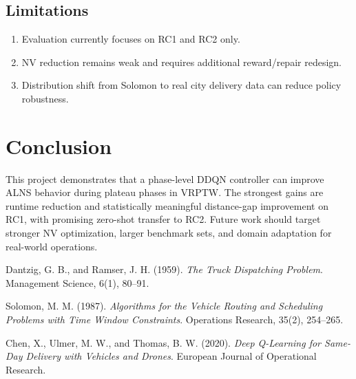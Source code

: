 \documentclass[13pt, a4paper]{extarticle}
\begin{document}
\subsection{Limitations}
\begin{enumerate}
    \item Evaluation currently focuses on RC1 and RC2 only.
    \item NV reduction remains weak and requires additional reward/repair redesign.
    \item Distribution shift from Solomon to real city delivery data can reduce policy robustness.
\end{enumerate}

\section{Conclusion}
This project demonstrates that a phase-level DDQN controller can improve ALNS behavior during plateau phases in VRPTW. The strongest gains are runtime reduction and statistically meaningful distance-gap improvement on RC1, with promising zero-shot transfer to RC2. Future work should target stronger NV optimization, larger benchmark sets, and domain adaptation for real-world operations.

\newpage
\begin{thebibliography}{}

Dantzig, G. B., and Ramser, J. H. (1959).
\textit{The Truck Dispatching Problem}.
Management Science, 6(1), 80--91.

Solomon, M. M. (1987).
\textit{Algorithms for the Vehicle Routing and Scheduling Problems with Time Window Constraints}.
Operations Research, 35(2), 254--265.

Chen, X., Ulmer, M. W., and Thomas, B. W. (2020).
\textit{Deep Q-Learning for Same-Day Delivery with Vehicles and Drones}.
European Journal of Operational Research.

\end{thebibliography}
\end{document}
